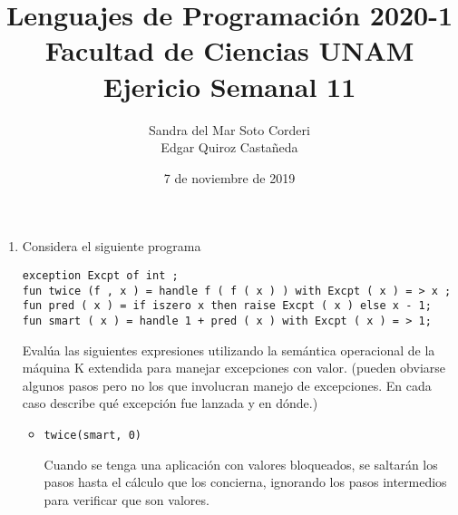 \documentclass{article}
\title{
    Lenguajes de Programación 2020-1\\
    Facultad de Ciencias UNAM\\
    Ejericio Semanal 11
}
\author{
    Sandra del Mar Soto Corderi\\
    Edgar Quiroz Castañeda
}
\date{
    7 de noviembre de 2019
}
\newcommand{\tx}[1]{\texttt{#1}}
\begin{document}
    \maketitle
	\begin{enumerate}
		\item {
		Considera el siguiente programa

		\tx{exception Excpt of int ;}\\
		\tx{fun twice (f , x ) = handle f ( f ( x ) ) with Excpt ( x ) = > x ;}\\
		\tx{fun pred ( x ) = if iszero x then raise Excpt ( x ) else x - 1;}\\
		\tx{fun smart ( x ) = handle 1 + pred ( x ) with Excpt ( x ) = > 1;}
		
		Evalúa las siguientes expresiones utilizando la semántica operacional de
		la máquina K extendida para manejar excepciones con valor. (pueden
		obviarse algunos pasos pero no los que involucran manejo de excepciones.
		En cada caso describe qué excepción fue lanzada y en dónde.)

		\begin{itemize}
			\item {
			\texttt{twice(smart, 0)}

			Cuando se tenga una aplicación con valores bloqueados, se saltarán 
			los pasos hasta el cálculo que los concierna, ignorando los pasos 
			intermedios para verificar que son valores.

}
\end{itemize}}
\end{enumerate}
\end{document}
